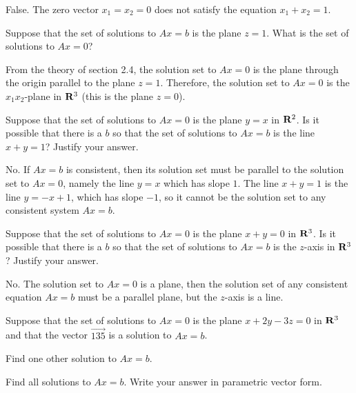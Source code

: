 \begin{problems}
\begin{solution}
False.  The zero vector $x_1 = x_2 = 0$ does not satisfy the equation 
$x_1 + x_2 = 1$.
\end{solution}


\problem %
Suppose that the set of solutions to $Ax = b$ is the plane $z=1$.  What is the
set of solutions to $Ax = 0$?

\begin{solution}
  From the theory of section 2.4, the solution set to $Ax = 0$ is the plane
  through the origin parallel to the plane $z=1$.  Therefore, the solution set
  to $Ax = 0$ is the $x_1x_2$-plane in ${\bf R}^3$ (this is the plane $z=0$).
\end{solution}

\problem %
Suppose that the set of solutions to $Ax = 0$ is the plane
$y=x$ in ${\bf R}^2$.  Is it possible that there is a $b$ so that
the set of solutions to $Ax = b$ is the line $x+y=1$?  Justify your answer.

\begin{solution}
No.  If $Ax=b$ is consistent, then its solution set must be parallel to the solution set to $Ax=0$, namely the line $y=x$ which has slope $1$.  The line $x+y=1$ is the line $y= -x + 1$, which has slope $-1$, so it cannot be the solution set to any consistent system $Ax=b$.
\end{solution}

\problem %
Suppose that the set of solutions to $Ax = 0$ is the plane
$x+y = 0$ in ${\bf R}^3$.  Is it possible that there is a $b$ so that
the set of solutions to $Ax = b$ is the $z$-axis in ${\bf R}^3$?  Justify your answer.

\begin{solution}
  No.  The solution set to $Ax=0$ is a plane, then the solution set of any
  consistent equation $Ax=b$ must be a parallel plane, but the $z$-axis is a
  line.
\end{solution}

\problem %
Suppose that the set of solutions to $Ax = 0$ is the plane
$x + 2y - 3z = 0$ in ${\bf R}^3$ and that the vector $\vec{1 3 5}$ is a solution to $Ax = b$. 
\begin{subproblems}
    \item Find one other solution to $Ax=b$.
    \item Find all solutions to $Ax=b$.  Write your answer in parametric vector form.
\end{subproblems}


\end{problems}
